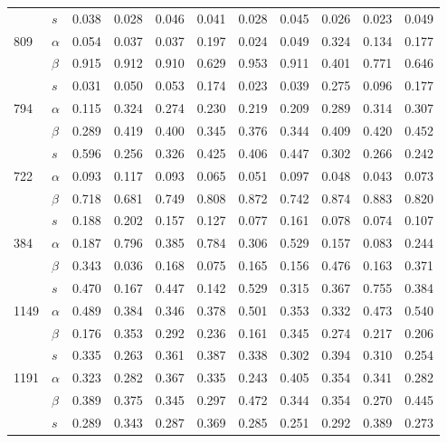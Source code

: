 \begin{longtable}{llrrrrrrrrr}
     & $s$ & 0.038 & 0.028 & 0.046 & 0.041 & 0.028 & 0.045 & 0.026 & 0.023 & 0.049 \\
\cline{1-11}
\multirow{3}{*}{809} & $\alpha$ & 0.054 & 0.037 & 0.037 & 0.197 & 0.024 & 0.049 & 0.324 & 0.134 & 0.177 \\
     & $\beta$ & 0.915 & 0.912 & 0.910 & 0.629 & 0.953 & 0.911 & 0.401 & 0.771 & 0.646 \\
     & $s$ & 0.031 & 0.050 & 0.053 & 0.174 & 0.023 & 0.039 & 0.275 & 0.096 & 0.177 \\
\cline{1-11}
\multirow{3}{*}{794} & $\alpha$ & 0.115 & 0.324 & 0.274 & 0.230 & 0.219 & 0.209 & 0.289 & 0.314 & 0.307 \\
     & $\beta$ & 0.289 & 0.419 & 0.400 & 0.345 & 0.376 & 0.344 & 0.409 & 0.420 & 0.452 \\
     & $s$ & 0.596 & 0.256 & 0.326 & 0.425 & 0.406 & 0.447 & 0.302 & 0.266 & 0.242 \\
\cline{1-11}
\multirow{3}{*}{722} & $\alpha$ & 0.093 & 0.117 & 0.093 & 0.065 & 0.051 & 0.097 & 0.048 & 0.043 & 0.073 \\
     & $\beta$ & 0.718 & 0.681 & 0.749 & 0.808 & 0.872 & 0.742 & 0.874 & 0.883 & 0.820 \\
     & $s$ & 0.188 & 0.202 & 0.157 & 0.127 & 0.077 & 0.161 & 0.078 & 0.074 & 0.107 \\
\cline{1-11}
\multirow{3}{*}{384} & $\alpha$ & 0.187 & 0.796 & 0.385 & 0.784 & 0.306 & 0.529 & 0.157 & 0.083 & 0.244 \\
     & $\beta$ & 0.343 & 0.036 & 0.168 & 0.075 & 0.165 & 0.156 & 0.476 & 0.163 & 0.371 \\
     & $s$ & 0.470 & 0.167 & 0.447 & 0.142 & 0.529 & 0.315 & 0.367 & 0.755 & 0.384 \\
\cline{1-11}
\multirow{3}{*}{1149} & $\alpha$ & 0.489 & 0.384 & 0.346 & 0.378 & 0.501 & 0.353 & 0.332 & 0.473 & 0.540 \\
     & $\beta$ & 0.176 & 0.353 & 0.292 & 0.236 & 0.161 & 0.345 & 0.274 & 0.217 & 0.206 \\
     & $s$ & 0.335 & 0.263 & 0.361 & 0.387 & 0.338 & 0.302 & 0.394 & 0.310 & 0.254 \\
\cline{1-11}
\multirow{3}{*}{1191} & $\alpha$ & 0.323 & 0.282 & 0.367 & 0.335 & 0.243 & 0.405 & 0.354 & 0.341 & 0.282 \\
     & $\beta$ & 0.389 & 0.375 & 0.345 & 0.297 & 0.472 & 0.344 & 0.354 & 0.270 & 0.445 \\
     & $s$ & 0.289 & 0.343 & 0.287 & 0.369 & 0.285 & 0.251 & 0.292 & 0.389 & 0.273 \\

\end{longtable}
